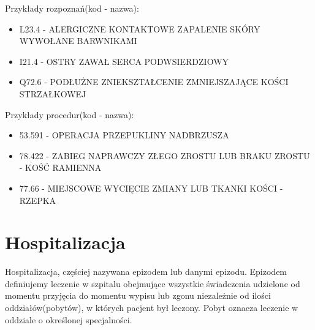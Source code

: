 Przykłady rozpoznań(kod - nazwa):
\begin{itemize}
\item L23.4 - ALERGICZNE KONTAKTOWE ZAPALENIE SKÓRY WYWOŁANE BARWNIKAMI
\item I21.4 - OSTRY ZAWAŁ SERCA PODWSIERDZIOWY
\item Q72.6 - PODŁUŻNE ZNIEKSZTAŁCENIE ZMNIEJSZAJĄCE KOŚCI STRZAŁKOWEJ
\end{itemize}

Przykłady procedur(kod - nazwa):
\begin{itemize}
\item 53.591 - OPERACJA PRZEPUKLINY NADBRZUSZA
\item 78.422 - ZABIEG NAPRAWCZY ZŁEGO ZROSTU LUB BRAKU ZROSTU - KOŚĆ RAMIENNA
\item 77.66 - MIEJSCOWE WYCIĘCIE ZMIANY LUB TKANKI KOŚCI - RZEPKA
\end{itemize}


\section{Hospitalizacja}
\label{sec:hospitalizacja}

Hospitalizacja, częściej nazywana epizodem lub danymi epizodu. Epizodem definiujemy leczenie w szpitalu obejmujące wszystkie świadczenia udzielone od momentu przyjęcia do momentu wypisu lub zgonu niezależnie od ilości oddziałów(pobytów), w których pacjent był leczony. Pobyt oznacza leczenie w oddziale o określonej specjalności.

